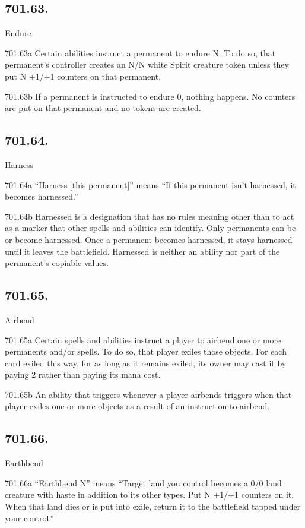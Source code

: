 \subsection*{701.63.}
Endure

701.63a Certain abilities instruct a permanent to endure N. To do so, that permanent’s controller creates an N/N white Spirit creature token unless they put N +1/+1 counters on that permanent.

701.63b If a permanent is instructed to endure 0, nothing happens. No counters are put on that permanent and no tokens are created.

\subsection*{701.64.}
Harness

701.64a “Harness [this permanent]” means “If this permanent isn’t harnessed, it becomes harnessed.”

701.64b Harnessed is a designation that has no rules meaning other than to act as a marker that other spells and abilities can identify. Only permanents can be or become harnessed. Once a permanent becomes harnessed, it stays harnessed until it leaves the battlefield. Harnessed is neither an ability nor part of the permanent’s copiable values.

\subsection*{701.65.}
Airbend

701.65a Certain spells and abilities instruct a player to airbend one or more permanents and/or spells. To do so, that player exiles those objects. For each card exiled this way, for as long as it remains exiled, its owner may cast it by paying {2} rather than paying its mana cost.

701.65b An ability that triggers whenever a player airbends triggers when that player exiles one or more objects as a result of an instruction to airbend.

\subsection*{701.66.}
Earthbend

701.66a “Earthbend N” means “Target land you control becomes a 0/0 land creature with haste in addition to its other types. Put N +1/+1 counters on it. When that land dies or is put into exile, return it to the battlefield tapped under your control.”


